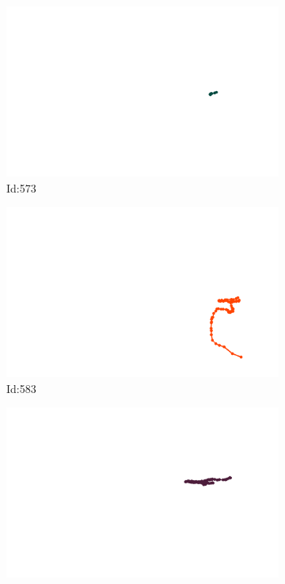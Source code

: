 \documentclass[12pt,twoside]{report}
\begin{document}
\begin{figure}
\begin{subfigure}[b]{0.20\textwidth}
\centering
\includegraphics[width=\textwidth]{../trajectories/573.png}
\caption{Id:573}
\end{subfigure}
\begin{subfigure}[b]{0.20\textwidth}
\centering
\includegraphics[width=\textwidth]{../trajectories/583.png}
\caption{Id:583}
\end{subfigure}
\begin{subfigure}[b]{0.20\textwidth}
\centering
\includegraphics[width=\textwidth]{../trajectories/585.png}

\end{subfigure}
\end{figure}
\end{document}
